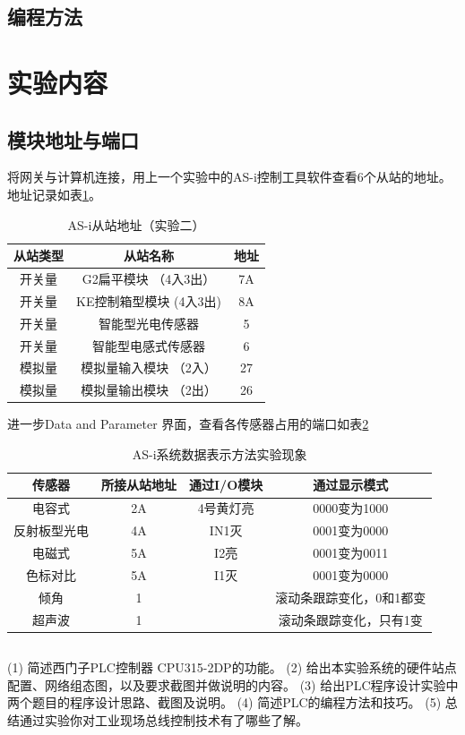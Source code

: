 \subsection{编程方法}
\section{实验内容}
\subsection{模块地址与端口}
将网关与计算机连接，用上一个实验中的AS-i控制工具软件查看6个从站的地址。地址记录如表\ref{tab:address}。

\begin{table}[htbp]
\centering
\begin{tabular}{|c|c|c|}
	\hline
	从站类型 & 从站名称 & 地址 \\
	\hline
	开关量 & G2扁平模块 （4入3出） & 7A \\
	开关量 & KE控制箱型模块 (4入3出) & 8A \\
	开关量 & 智能型光电传感器 & 5 \\
	开关量 & 智能型电感式传感器 & 6 \\
	模拟量 & 模拟量输入模块 （2入） & 27 \\
	模拟量 & 模拟量输出模块 （2出） & 26 \\
	\hline
\end{tabular}
\caption{AS-i从站地址（实验二）}
\label{tab:address}
\end{table}

进一步Data and Parameter 界面，查看各传感器占用的端口如表\ref{tab:port}

\begin{table}[htbp]
\centering
\begin{tabular}{|c|c|c|c|}
	\hline
	传感器 & 所接从站地址 & 通过I/O模块 & 通过显示模式 \\
	\hline
	电容式 & 2A & 4号黄灯亮 & 0000变为1000 \\
	反射板型光电 & 4A & IN1灭 & 0001变为0000 \\
	电磁式 & 5A & I2亮 & 0001变为0011 \\
	色标对比 & 5A & I1灭 & 0001变为0000 \\
	倾角 & 1 & & 滚动条跟踪变化，0和1都变\\
	超声波 & 1 & & 滚动条跟踪变化，只有1变 \\
	\hline
\end{tabular}
\caption{AS-i系统数据表示方法实验现象}
\label{tab:port}
\end{table}


\subsection{}

(1) 简述西门子PLC控制器 CPU315-2DP的功能。 (2) 给出本实验系统的硬件站点配置、网络组态图，以及要求截图并做说明的内容。 (3) 给出PLC程序设计实验中两个题目的程序设计思路、截图及说明。 (4) 简述PLC的编程方法和技巧。 (5) 总结通过实验你对工业现场总线控制技术有了哪些了解。


